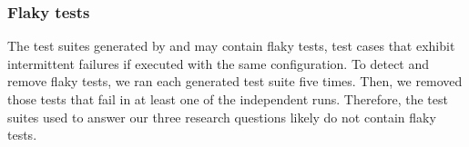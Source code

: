 



\subsubsection{Flaky tests}

The test suites generated by \cling and \evosuite may contain flaky tests, \ie test cases that exhibit intermittent failures if executed with the same configuration. To detect and remove flaky tests, we ran each generated test suite five times. Then, we removed those tests that fail in at least one of the independent runs. Therefore, the test suites used to answer our three research questions likely do not contain flaky tests.

 
